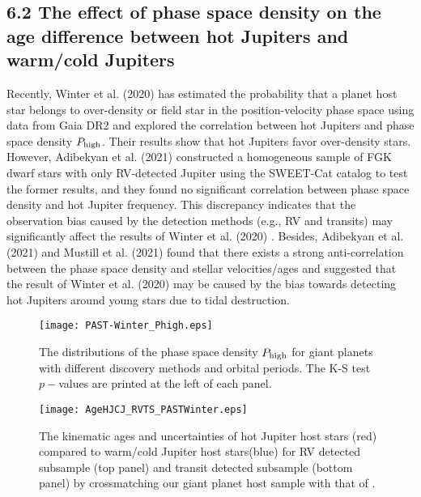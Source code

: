 \documentclass[twocolumn]{pnas-new}
\begin{document}
\subsection*{6.2 The effect of phase space density on the age difference between hot Jupiters and warm/cold Jupiters}
\label{sec.dis.density}
Recently, Winter et al. (2020) \cite{2020Natur.586..528W} has estimated the probability that a planet host star belongs to over-density or field star in the position-velocity phase space using data from Gaia DR2 and explored the correlation between hot Jupiters and phase space density $P_{\rm high}$.
Their results show that hot Jupiters favor over-density stars.
However, Adibekyan et al. (2021) \cite{2021A&A...649A.111A} constructed a homogeneous sample of FGK dwarf stars with only RV-detected Jupiter using the SWEET-Cat catalog to test the former results, and they found no significant correlation between phase space density and hot Jupiter frequency.
This discrepancy indicates that the observation bias caused by the detection methods (e.g., RV and transits) may significantly affect the results of Winter et al. (2020) \cite{2020Natur.586..528W}. 
Besides, Adibekyan et al. (2021) \cite{2021A&A...649A.111A} and Mustill et al. (2021) \cite{2021arXiv210315823M} found that there exists a strong anti-correlation between the phase space density and stellar velocities/ages and suggested that the result of Winter et al. (2020) \cite{2020Natur.586..528W} may be caused by the bias towards detecting hot Jupiters around young stars due to tidal destruction. 

\begin{figure}[!t]
\centering
\texttt{[image: PAST-Winter\_Phigh.eps]}
\caption{The distributions of the phase space density $P_{\rm high}$ for giant planets with different discovery methods and orbital periods.
The K-S test $p-$values are printed at the left of each panel.
\label{figPhighPASTSweet}}
\end{figure}

\begin{figure}[!t]
\centering
\texttt{[image: AgeHJCJ\_RVTS\_PASTWinter.eps]}
\caption{The kinematic ages and uncertainties of hot Jupiter host stars (red) compared to warm/cold Jupiter host stars(blue) for RV detected subsample (top panel) and transit detected subsample (bottom panel) by crossmatching our giant planet host sample with that of \cite{2020Natur.586..528W}.
\label{figAgeHJCJRVTS_PASTWinter}}
\end{figure}
\end{document}
